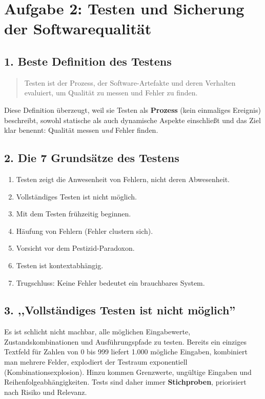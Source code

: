 \documentclass[
	fontsize=12pt,          %
	paper=a4,               %
	numbers=noenddot,       %
	listof=totoc,           %
	listof=entryprefix,     %
	listof=nochaptergap,    %
	bibliography=totoc,     %
	parskip=half,           %
	openany                 %
]{scrbook}
\begin{document}
\chapter*{Aufgabe 2: Testen und Sicherung der Softwarequalität}


\section*{1. Beste Definition des Testens}
\begin{quote}
	Testen ist der Prozess, der Software-Artefakte und deren Verhalten evaluiert, um Qualität zu messen und Fehler zu finden.
\end{quote}

Diese Definition überzeugt, weil sie Testen als \textbf{Prozess} (kein einmaliges Ereignis) beschreibt,
sowohl statische als auch dynamische Aspekte einschließt und das Ziel klar benennt: Qualität messen \emph{und} Fehler finden.


\section*{2. Die 7 Grundsätze des Testens}
\begin{enumerate}
	\item Testen zeigt die Anwesenheit von Fehlern, nicht deren Abwesenheit.
	\item Vollständiges Testen ist nicht möglich.
	\item Mit dem Testen frühzeitig beginnen.
	\item Häufung von Fehlern (Fehler clustern sich).
	\item Vorsicht vor dem Pestizid-Paradoxon.
	\item Testen ist kontextabhängig.
	\item Trugschluss: Keine Fehler bedeutet ein brauchbares System.
\end{enumerate}


\section*{3. ,,Vollständiges Testen ist nicht möglich''}
Es ist schlicht nicht machbar, alle möglichen Eingabewerte, Zustandskombinationen und Ausführungspfade zu testen.
Bereits ein einziges Textfeld für Zahlen von 0 bis 999 liefert 1.000 mögliche Eingaben, kombiniert man mehrere Felder, explodiert der Testraum exponentiell (Kombinationsexplosion).
Hinzu kommen Grenzwerte, ungültige Eingaben und Reihenfolgeabhängigkeiten.
Tests sind daher immer \textbf{Stichproben}, priorisiert nach Risiko und Relevanz.
\end{document}
